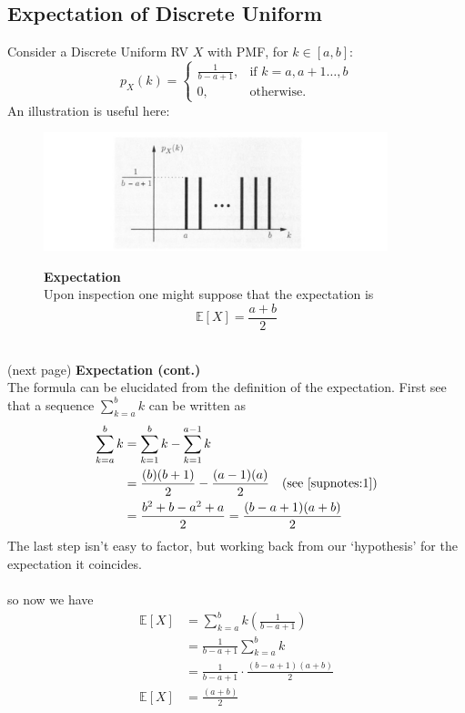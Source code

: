 \documentclass{report}
\begin{document}
\subsection{Expectation of Discrete Uniform}
Consider a Discrete Uniform RV $X$ with PMF, for $k\in[a,b]$:
\begin{equation*}
p_X(k)=\begin{cases}
\frac{1}{b-a+1},&\text{if }k=a,a+1\ldots,b\\
0,&\text{otherwise}.
\end{cases}
\end{equation*}
An illustration is useful here:
\begin{figure}[h]
\begin{center}
\includegraphics[width=10cm]{1}\\
\end{center}
\textbf{Expectation}\\
Upon inspection one might suppose that the expectation is
\begin{equation*}
\mathbb{E}[X]=\frac{a+b}{2}
\end{equation*}
\end{figure}\\
(next page)
\newpage
\noindent\textbf{Expectation (cont.)}\\
The formula can be elucidated from the definition of the expectation. First see that a sequence
$\sum^b_{k=a}k$ can be written as
\begin{align*}
\sum^b_{k=a}k&=\sum^b_{k=1}k-\sum^{a-1}_{k=1}k\\
&=\frac{(b)(b+1)}{2}-\frac{(a-1)(a)}{2}\quad\text{(see \ref{supnotes:1})}\\
&=\frac{b^2+b-a^2+a}{2}=\frac{(b-a+1)(a+b)}{2}
\end{align*}
The last step isn't easy to factor, but working back from our `hypothesis' for the expectation it coincides.\\
\vspace{1mm}\\
so now we have
\begin{align*}
\mathbb{E}[X]&=\sum^b_{k=a}k\left(\frac{1}{b-a+1}\right)\\
&=\frac{1}{b-a+1}\sum^b_{k=a}k\\
&=\frac{1}{b-a+1}\cdot\frac{(b-a+1)(a+b)}{2}\\
\mathbb{E}[X]&=\frac{(a+b)}{2}
\end{align*}
\newpage
\end{document}
